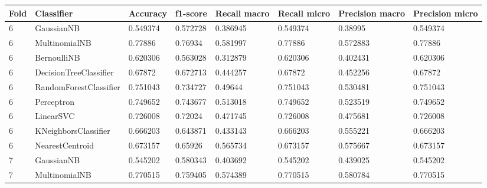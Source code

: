 \documentclass{article}
\begin{document}
\begin{table}[h]
\begin{tabular}{llllllll}
\textbf{Fold} & \textbf{Classifier}    & \textbf{Accuracy} & \textbf{f1-score} & \textbf{Recall macro} & \textbf{Recall micro} & \textbf{Precision macro} & \textbf{Precision micro} \\ \hline
6             & GaussianNB             & 0.549374          & 0.572728          & 0.386945              & 0.549374              & 0.38995                  & 0.549374                 \\
6             & MultinomialNB          & 0.77886           & 0.76934           & 0.581997              & 0.77886               & 0.572883                 & 0.77886                  \\
6             & BernoulliNB            & 0.620306          & 0.563028          & 0.312879              & 0.620306              & 0.402431                 & 0.620306                 \\
6             & DecisionTreeClassifier & 0.67872           & 0.672713          & 0.444257              & 0.67872               & 0.452256                 & 0.67872                  \\
6             & RandomForestClassifier & 0.751043          & 0.734727          & 0.49644               & 0.751043              & 0.530481                 & 0.751043                 \\
6             & Perceptron             & 0.749652          & 0.743677          & 0.513018              & 0.749652              & 0.523519                 & 0.749652                 \\
6             & LinearSVC              & 0.726008          & 0.72024           & 0.471745              & 0.726008              & 0.475681                 & 0.726008                 \\
6             & KNeighborsClassifier   & 0.666203          & 0.643871          & 0.433143              & 0.666203              & 0.555221                 & 0.666203                 \\
6             & NearestCentroid        & 0.673157          & 0.65926           & 0.565734              & 0.673157              & 0.575667                 & 0.673157                 \\
7             & GaussianNB             & 0.545202          & 0.580343          & 0.403692              & 0.545202              & 0.439025                 & 0.545202                 \\
7             & MultinomialNB          & 0.770515          & 0.759405          & 0.574389              & 0.770515              & 0.580784                 & 0.770515                 \\

\end{tabular}
\end{table}
\end{document}
